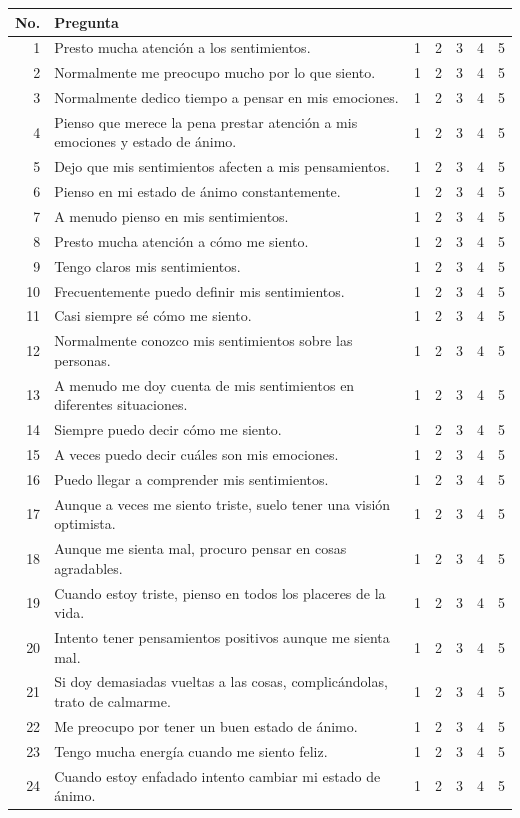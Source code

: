 \documentclass[
  10pt,
  spanish,
]{article}
\begin{document}
\begin{table}[H]
\centering
\begin{tabular}{|>{}r|l|r|r|r|r|>{}r|}
\hline
No. & Pregunta &  &  &  &  & \\
\hline
1 & Presto mucha atención a los sentimientos. & 1 & 2 & 3 & 4 & 5\\
\hline
2 & Normalmente me preocupo mucho por lo que siento. & 1 & 2 & 3 & 4 & 5\\
\hline
3 & Normalmente dedico tiempo a pensar en mis emociones. & 1 & 2 & 3 & 4 & 5\\
\hline
4 & Pienso que merece la pena prestar atención a mis emociones y estado de ánimo. & 1 & 2 & 3 & 4 & 5\\
\hline
5 & Dejo que mis sentimientos afecten a mis pensamientos. & 1 & 2 & 3 & 4 & 5\\
\hline
6 & Pienso en mi estado de ánimo constantemente. & 1 & 2 & 3 & 4 & 5\\
\hline
7 & A menudo pienso en mis sentimientos. & 1 & 2 & 3 & 4 & 5\\
\hline
8 & Presto mucha atención a cómo me siento. & 1 & 2 & 3 & 4 & 5\\
\hline
9 & Tengo claros mis sentimientos. & 1 & 2 & 3 & 4 & 5\\
\hline
10 & Frecuentemente puedo definir mis sentimientos. & 1 & 2 & 3 & 4 & 5\\
\hline
11 & Casi siempre sé cómo me siento. & 1 & 2 & 3 & 4 & 5\\
\hline
12 & Normalmente conozco mis sentimientos sobre las personas. & 1 & 2 & 3 & 4 & 5\\
\hline
13 & A menudo me doy cuenta de mis sentimientos en diferentes situaciones. & 1 & 2 & 3 & 4 & 5\\
\hline
14 & Siempre puedo decir cómo me siento. & 1 & 2 & 3 & 4 & 5\\
\hline
15 & A veces puedo decir cuáles son mis emociones. & 1 & 2 & 3 & 4 & 5\\
\hline
16 & Puedo llegar a comprender mis sentimientos. & 1 & 2 & 3 & 4 & 5\\
\hline
17 & Aunque a veces me siento triste, suelo tener una visión optimista. & 1 & 2 & 3 & 4 & 5\\
\hline
18 & Aunque me sienta mal, procuro pensar en cosas agradables. & 1 & 2 & 3 & 4 & 5\\
\hline
19 & Cuando estoy triste, pienso en todos los placeres de la vida. & 1 & 2 & 3 & 4 & 5\\
\hline
20 & Intento tener pensamientos positivos aunque me sienta mal. & 1 & 2 & 3 & 4 & 5\\
\hline
21 & Si doy demasiadas vueltas a las cosas, complicándolas, trato de calmarme. & 1 & 2 & 3 & 4 & 5\\
\hline
22 & Me preocupo por tener un buen estado de ánimo. & 1 & 2 & 3 & 4 & 5\\
\hline
23 & Tengo mucha energía cuando me siento feliz. & 1 & 2 & 3 & 4 & 5\\
\hline
24 & Cuando estoy enfadado intento cambiar mi estado de ánimo. & 1 & 2 & 3 & 4 & 5\\
\hline
\end{tabular}
\end{table}
\end{document}
